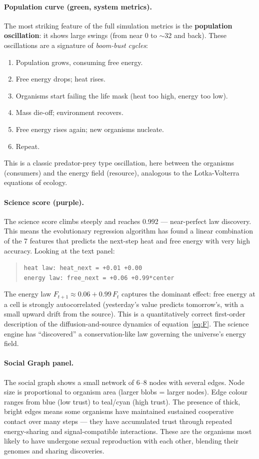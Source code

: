 \documentclass[12pt,a4paper]{article}
\begin{document}
\paragraph{Population curve (green, system metrics).}
The most striking feature of the full simulation metrics
is the \textbf{population oscillation}: it shows large swings
(from near 0 to $\sim$32 and back).
These oscillations are a signature of \emph{boom-bust cycles}:
\begin{enumerate}[nosep]
\item Population grows, consuming free energy.
\item Free energy drops; heat rises.
\item Organisms start failing the life mask (heat too high, energy too low).
\item Mass die-off; environment recovers.
\item Free energy rises again; new organisms nucleate.
\item Repeat.
\end{enumerate}
This is a classic predator-prey type oscillation,
here between the organisms (consumers) and the energy field (resource),
analogous to the Lotka-Volterra equations of ecology.

\paragraph{Science score (purple).}
The science score climbs steeply and reaches 0.992 —
near-perfect law discovery.
This means the evolutionary regression algorithm has found
a linear combination of the 7 features that predicts
the next-step heat and free energy with very high accuracy.
Looking at the text panel:

\begin{quote}
\texttt{heat law: heat\_next = +0.01 +0.00}\\
\texttt{energy law: free\_next = +0.06 +0.99*center}
\end{quote}

The energy law $F_{t+1} \approx 0.06 + 0.99\,F_t$ captures
the dominant effect: free energy at a cell is strongly
autocorrelated (yesterday's value predicts tomorrow's,
with a small upward drift from the source).
This is a quantitatively correct first-order description of
the diffusion-and-source dynamics of equation~\eqref{eq:F}.
The science engine has ``discovered'' a conservation-like law
governing the universe's energy field.

\paragraph{Social Graph panel.}
The social graph shows a small network of 6--8 nodes with
several edges.
Node size is proportional to organism area (larger blobs = larger nodes).
Edge colour ranges from blue (low trust) to teal/cyan (high trust).
The presence of thick, bright edges means some organisms
have maintained sustained cooperative contact over many steps —
they have accumulated trust through repeated energy-sharing
and signal-compatible interactions.
These are the organisms most likely to have undergone sexual
reproduction with each other,
blending their genomes and sharing discoveries.
\end{document}
